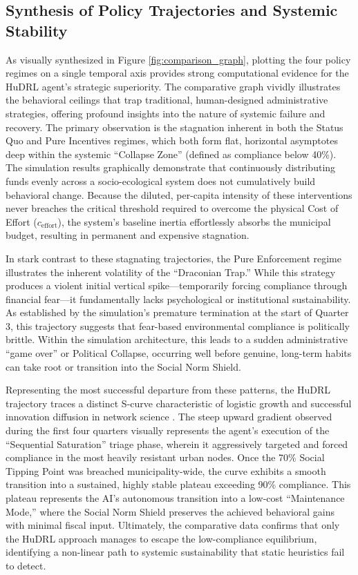 \subsection{Synthesis of Policy Trajectories and Systemic Stability}
As visually synthesized in Figure \ref{fig:comparison_graph}, plotting the four policy regimes on a single temporal axis provides strong computational evidence for the HuDRL agent's strategic superiority. The comparative graph vividly illustrates the behavioral ceilings that trap traditional, human-designed administrative strategies, offering profound insights into the nature of systemic failure and recovery. The primary observation is the stagnation inherent in both the Status Quo and Pure Incentives regimes, which both form flat, horizontal asymptotes deep within the systemic ``Collapse Zone'' (defined as compliance below 40\%). The simulation results graphically demonstrate that continuously distributing funds evenly across a socio-ecological system does not cumulatively build behavioral change. Because the diluted, per-capita intensity of these interventions never breaches the critical threshold required to overcome the physical Cost of Effort ($c_{\text{effort}}$), the system's baseline inertia effortlessly absorbs the municipal budget, resulting in permanent and expensive stagnation.

In stark contrast to these stagnating trajectories, the Pure Enforcement regime illustrates the inherent volatility of the ``Draconian Trap.'' While this strategy produces a violent initial vertical spike—temporarily forcing compliance through financial fear—it fundamentally lacks psychological or institutional sustainability. As established by the simulation's premature termination at the start of Quarter 3, this trajectory suggests that fear-based environmental compliance is politically brittle. Within the simulation architecture, this leads to a sudden administrative ``game over'' or Political Collapse, occurring well before genuine, long-term habits can take root or transition into the Social Norm Shield.

Representing the most successful departure from these patterns, the HuDRL trajectory traces a distinct S-curve characteristic of logistic growth and successful innovation diffusion in network science \citep{Centola2018}. The steep upward gradient observed during the first four quarters visually represents the agent's execution of the ``Sequential Saturation'' triage phase, wherein it aggressively targeted and forced compliance in the most heavily resistant urban nodes. Once the 70\% Social Tipping Point was breached municipality-wide, the curve exhibits a smooth transition into a sustained, highly stable plateau exceeding 90\% compliance. This plateau represents the AI's autonomous transition into a low-cost ``Maintenance Mode,'' where the Social Norm Shield preserves the achieved behavioral gains with minimal fiscal input. Ultimately, the comparative data confirms that only the HuDRL approach manages to escape the low-compliance equilibrium, identifying a non-linear path to systemic sustainability that static heuristics fail to detect.

